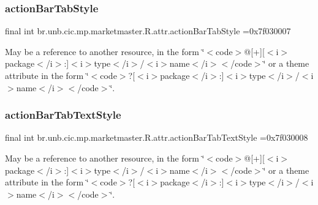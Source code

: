\subsubsection{\texorpdfstring{action\+Bar\+Tab\+Style}{actionBarTabStyle}}
{\footnotesize\ttfamily final int br.\+unb.\+cic.\+mp.\+marketmaster.\+R.\+attr.\+action\+Bar\+Tab\+Style =0x7f030007\hspace{0.3cm}{\ttfamily [static]}}

May be a reference to another resource, in the form \char`\"{}$<$code$>$@\mbox{[}+\mbox{]}\mbox{[}$<$i$>$package$<$/i$>$\+:\mbox{]}$<$i$>$type$<$/i$>$/$<$i$>$name$<$/i$>$$<$/code$>$\char`\"{} or a theme attribute in the form \char`\"{}$<$code$>$?\mbox{[}$<$i$>$package$<$/i$>$\+:\mbox{]}$<$i$>$type$<$/i$>$/$<$i$>$name$<$/i$>$$<$/code$>$\char`\"{}. \mbox{\label{classbr_1_1unb_1_1cic_1_1mp_1_1marketmaster_1_1R_1_1attr_a3d1cf28df595c465ba919b48229dd779}} 
\subsubsection{\texorpdfstring{action\+Bar\+Tab\+Text\+Style}{actionBarTabTextStyle}}
{\footnotesize\ttfamily final int br.\+unb.\+cic.\+mp.\+marketmaster.\+R.\+attr.\+action\+Bar\+Tab\+Text\+Style =0x7f030008\hspace{0.3cm}{\ttfamily [static]}}

May be a reference to another resource, in the form \char`\"{}$<$code$>$@\mbox{[}+\mbox{]}\mbox{[}$<$i$>$package$<$/i$>$\+:\mbox{]}$<$i$>$type$<$/i$>$/$<$i$>$name$<$/i$>$$<$/code$>$\char`\"{} or a theme attribute in the form \char`\"{}$<$code$>$?\mbox{[}$<$i$>$package$<$/i$>$\+:\mbox{]}$<$i$>$type$<$/i$>$/$<$i$>$name$<$/i$>$$<$/code$>$\char`\"{}. \mbox{\label{classbr_1_1unb_1_1cic_1_1mp_1_1marketmaster_1_1R_1_1attr_aae1d08ccf9716d75128d5f49a8f3af59}} 
